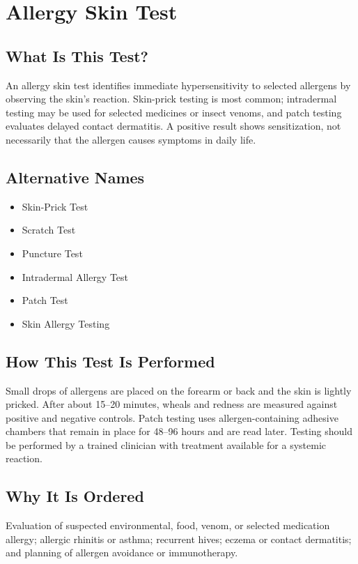 \chapter{Allergy Skin Test}

\section*{What Is This Test?}
An allergy skin test identifies immediate hypersensitivity to selected allergens by observing the skin's reaction. Skin-prick testing is most common; intradermal testing may be used for selected medicines or insect venoms, and patch testing evaluates delayed contact dermatitis. A positive result shows sensitization, not necessarily that the allergen causes symptoms in daily life.

\section*{Alternative Names}
\begin{itemize}
  \item Skin-Prick Test
  \item Scratch Test
  \item Puncture Test
  \item Intradermal Allergy Test
  \item Patch Test
  \item Skin Allergy Testing
\end{itemize}
\section*{How This Test Is Performed}
Small drops of allergens are placed on the forearm or back and the skin is lightly pricked. After about 15--20 minutes, wheals and redness are measured against positive and negative controls. Patch testing uses allergen-containing adhesive chambers that remain in place for 48--96 hours and are read later. Testing should be performed by a trained clinician with treatment available for a systemic reaction.

\section*{Why It Is Ordered}
Evaluation of suspected environmental, food, venom, or selected medication allergy; allergic rhinitis or asthma; recurrent hives; eczema or contact dermatitis; and planning of allergen avoidance or immunotherapy.

